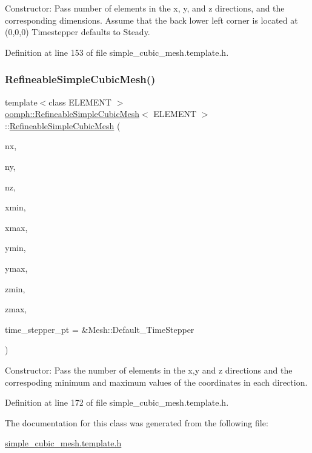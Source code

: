 Constructor\+: Pass number of elements in the x, y, and z directions, and the corresponding dimensions. Assume that the back lower left corner is located at (0,0,0) Timestepper defaults to Steady. 



Definition at line 153 of file simple\+\_\+cubic\+\_\+mesh.\+template.\+h.

\mbox{\label{classoomph_1_1RefineableSimpleCubicMesh_a058dc3781f5bf9b5580380e1161ad7d5}} 
\subsubsection{\texorpdfstring{Refineable\+Simple\+Cubic\+Mesh()}{RefineableSimpleCubicMesh()}\hspace{0.1cm}{\footnotesize\ttfamily [2/2]}}
{\footnotesize\ttfamily template$<$class E\+L\+E\+M\+E\+NT $>$ \\
\hyperlink{classoomph_1_1RefineableSimpleCubicMesh}{oomph\+::\+Refineable\+Simple\+Cubic\+Mesh}$<$ E\+L\+E\+M\+E\+NT $>$\+::\hyperlink{classoomph_1_1RefineableSimpleCubicMesh}{Refineable\+Simple\+Cubic\+Mesh} (\begin{DoxyParamCaption}\item[{const unsigned \&}]{nx,  }\item[{const unsigned \&}]{ny,  }\item[{const unsigned \&}]{nz,  }\item[{const double \&}]{xmin,  }\item[{const double \&}]{xmax,  }\item[{const double \&}]{ymin,  }\item[{const double \&}]{ymax,  }\item[{const double \&}]{zmin,  }\item[{const double \&}]{zmax,  }\item[{Time\+Stepper $\ast$}]{time\+\_\+stepper\+\_\+pt = {\ttfamily \&Mesh\+:\+:Default\+\_\+TimeStepper} }\end{DoxyParamCaption})\hspace{0.3cm}{\ttfamily [inline]}}



Constructor\+: Pass the number of elements in the x,y and z directions and the correspoding minimum and maximum values of the coordinates in each direction. 



Definition at line 172 of file simple\+\_\+cubic\+\_\+mesh.\+template.\+h.



The documentation for this class was generated from the following file\+:\begin{DoxyCompactItemize}
\item 
\hyperlink{simple__cubic__mesh_8template_8h}{simple\+\_\+cubic\+\_\+mesh.\+template.\+h}\end{DoxyCompactItemize}
